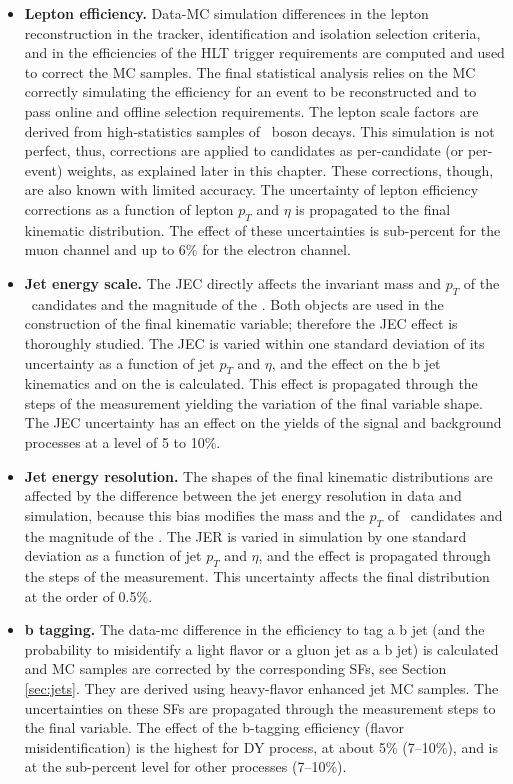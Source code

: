\begin{itemize}

\item{\bf Lepton efficiency.} 
Data-MC simulation differences in the lepton reconstruction in the tracker, identification and isolation selection criteria, and in the efficiencies of the HLT trigger requirements are computed and used to correct the MC samples. The final statistical analysis relies on the MC correctly simulating the efficiency for an event to be reconstructed and to pass online and offline selection requirements. The lepton scale factors are derived from high-statistics samples of \PZ~boson decays. This simulation is not perfect, thus, corrections are applied to candidates as per-candidate (or per-event) weights, as explained later in this chapter. These corrections, though, are also known with limited accuracy. The uncertainty of lepton efficiency corrections as a function of lepton $p_T$ and $\eta$ is propagated to the final kinematic distribution. The effect of these uncertainties is sub-percent for the muon channel and up to 6\% for the electron channel.

\item{\bf Jet energy scale.}
The JEC directly affects the invariant mass and $p_T$ of the \HBB~candidates and the magnitude of the \PTslash. Both objects are used in the construction of the final kinematic variable; therefore the JEC effect is thoroughly studied. The JEC is varied within one standard deviation of its uncertainty as a function of jet $p_T$ and $\eta$, and the effect on the b jet kinematics and on the \PTslash is calculated. This effect is propagated through the steps of the measurement yielding the variation of the final variable shape. The JEC uncertainty has an effect on the yields of the signal and background processes at a level of 5 to 10\%.

\item{\bf Jet energy resolution.} 
The shapes of the final kinematic distributions are affected by the difference between the jet energy
resolution in data and simulation, because this bias modifies the mass and the $p_T$ of \HBB~candidates and the magnitude of the \PTslash. The JER is varied in simulation by one standard deviation as a function of jet $p_T$ and $\eta$, and the effect is propagated through the steps of the measurement. This uncertainty affects the final distribution at the order of 0.5\%.

\item{\bf b tagging.}
The data-mc difference in the efficiency to tag a b jet (and the probability to misidentify a light flavor or a gluon jet as a b jet) is calculated and MC samples are corrected by the corresponding SFs, see Section \ref{sec:jets}. They are derived using heavy-flavor enhanced jet MC samples. The uncertainties on these SFs are propagated through the measurement steps to the final variable. The effect of the b-tagging efficiency (flavor misidentification) is the highest for DY process, at about 5\% (7--10\%), and is at the sub-percent level for other processes (7--10\%). 


\end{itemize}
